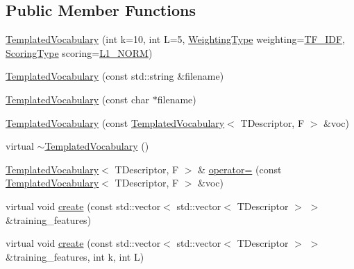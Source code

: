 \subsection*{Public Member Functions}
\begin{DoxyCompactItemize}
\item 
\mbox{\hyperlink{class_d_bo_w2_1_1_templated_vocabulary_a0dbbcb6bf766b09f08d945a2af0dbea8}{Templated\+Vocabulary}} (int k=10, int L=5, \mbox{\hyperlink{namespace_d_bo_w2_a5de5c8a307aca9a84ffefda2a9bc467a}{Weighting\+Type}} weighting=\mbox{\hyperlink{namespace_d_bo_w2_a5de5c8a307aca9a84ffefda2a9bc467aaa3425e88466862008dff6883e07e205d}{T\+F\+\_\+\+I\+DF}}, \mbox{\hyperlink{namespace_d_bo_w2_aa252a592dd607c6e60dede06ceef2722}{Scoring\+Type}} scoring=\mbox{\hyperlink{namespace_d_bo_w2_aa252a592dd607c6e60dede06ceef2722a2df432e58efd2a13d4950ee96aa6a20f}{L1\+\_\+\+N\+O\+RM}})
\item 
\mbox{\hyperlink{class_d_bo_w2_1_1_templated_vocabulary_a72fc6a164a5174003d19bd3c54615de6}{Templated\+Vocabulary}} (const std\+::string \&filename)
\item 
\mbox{\hyperlink{class_d_bo_w2_1_1_templated_vocabulary_a255d68e7b4235487f8d2d8ea0cbaf43a}{Templated\+Vocabulary}} (const char $\ast$filename)
\item 
\mbox{\hyperlink{class_d_bo_w2_1_1_templated_vocabulary_aac48ee5331b5d88a4db1a3c93cb0f6a5}{Templated\+Vocabulary}} (const \mbox{\hyperlink{class_d_bo_w2_1_1_templated_vocabulary}{Templated\+Vocabulary}}$<$ T\+Descriptor, F $>$ \&voc)
\item 
virtual \mbox{\hyperlink{class_d_bo_w2_1_1_templated_vocabulary_a9d15f985a0c3badc1518be0fbe663099}{$\sim$\+Templated\+Vocabulary}} ()
\item 
\mbox{\hyperlink{class_d_bo_w2_1_1_templated_vocabulary}{Templated\+Vocabulary}}$<$ T\+Descriptor, F $>$ \& \mbox{\hyperlink{class_d_bo_w2_1_1_templated_vocabulary_a5355c25b6f37c11acffe48996e19323f}{operator=}} (const \mbox{\hyperlink{class_d_bo_w2_1_1_templated_vocabulary}{Templated\+Vocabulary}}$<$ T\+Descriptor, F $>$ \&voc)
\item 
virtual void \mbox{\hyperlink{class_d_bo_w2_1_1_templated_vocabulary_a3679b5a8f2043021a4faab99ccfe4ebe}{create}} (const std\+::vector$<$ std\+::vector$<$ T\+Descriptor $>$ $>$ \&training\+\_\+features)
\item 
virtual void \mbox{\hyperlink{class_d_bo_w2_1_1_templated_vocabulary_a94d48231b043a1102af4c35e256f2054}{create}} (const std\+::vector$<$ std\+::vector$<$ T\+Descriptor $>$ $>$ \&training\+\_\+features, int k, int L)

\end{DoxyCompactItemize}
